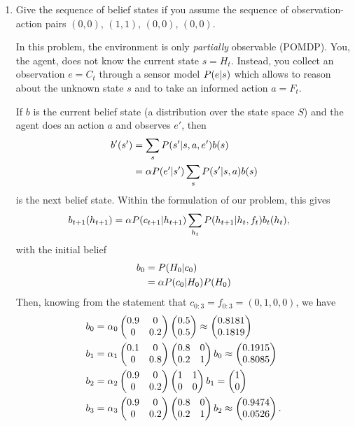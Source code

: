 \documentclass[11pt, a4paper]{article}
\begin{document}
\begin{enumerate}
    \item Give the sequence of belief states if you assume the sequence of observation-action pairs $(0, 0)$, $(1, 1)$, $(0, 0)$, $(0, 0)$.

    \begin{solution}
        In this problem, the environment is only \emph{partially} observable (POMDP). You, the agent, does not know the current state $s = H_t$. Instead, you collect an observation $e = C_t$ through a sensor model $P(e \vert s)$ which allows to reason about the unknown state $s$ and to take an informed action $a = F_t$.

        If $b$ is the current belief state (a distribution over the state space $S$) and the agent does an action $a$ and observes $e'$, then
        \begin{align*}
            b'(s') & = \sum_s P(s' \vert s, a, e') b(s) \\
            & = \alpha P(e' \vert s') \sum_s P(s' \vert s, a) b(s)
        \end{align*}
        is the next belief state. Within the formulation of our problem, this gives
        \begin{align*}
            b_{t+1}(h_{t+1}) & = \alpha P(c_{t+1} \vert h_{t+1}) \sum_{h_t} P(h_{t+1} \vert h_t, f_t) b_t(h_t),
        \end{align*}
        with the initial belief
        \begin{align*}
            b_0 & = P(H_0 \vert c_0) \\
            & = \alpha P(c_0 \vert H_0) P(H_0)
        \end{align*}
        Then, knowing from the statement that $c_{0:3} = f_{0:3} = (0, 1, 0, 0)$, we have
        \begin{align*}
            b_0 & = \alpha_0 \begin{pmatrix}0.9 & 0 \\ 0 & 0.2\end{pmatrix} \begin{pmatrix}0.5 \\ 0.5\end{pmatrix} \approx \begin{pmatrix}0.8181 \\ 0.1819\end{pmatrix} \\
            b_1 & = \alpha_1 \begin{pmatrix}0.1 & 0 \\ 0 & 0.8\end{pmatrix} \begin{pmatrix}0.8 & 0 \\ 0.2 & 1\end{pmatrix} b_0 \approx \begin{pmatrix}0.1915 \\ 0.8085\end{pmatrix} \\
            b_2 & = \alpha_2 \begin{pmatrix}0.9 & 0 \\ 0 & 0.2\end{pmatrix} \begin{pmatrix}1 & 1 \\ 0 & 0\end{pmatrix} b_1 = \begin{pmatrix}1 \\ 0\end{pmatrix} \\
            b_3 & = \alpha_3 \begin{pmatrix}0.9 & 0 \\ 0 & 0.2\end{pmatrix} \begin{pmatrix}0.8 & 0 \\ 0.2 & 1\end{pmatrix} b_2 \approx \begin{pmatrix}0.9474 \\ 0.0526\end{pmatrix} .
        \end{align*}
    \end{solution}


\end{enumerate}
\end{document}
